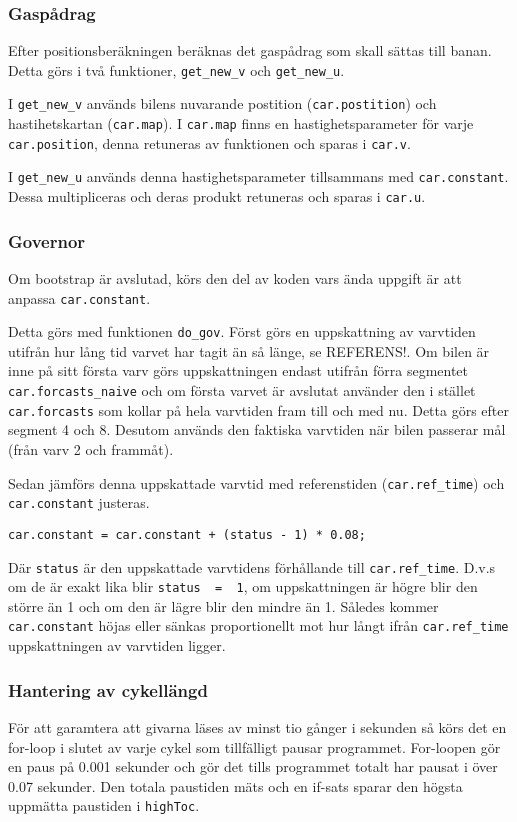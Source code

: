 \subsubsection{Gaspådrag}

Efter positionsberäkningen beräknas det gaspådrag som skall sättas till banan. Detta görs i två
funktioner, \texttt{get\_new\_v} och \texttt{get\_new\_u}.
 
I \texttt{get\_new\_v} används bilens nuvarande postition (\texttt{car.postition})
och hastihetskartan (\texttt{car.map}). I \texttt{car.map} finns en
hastighetsparameter för varje \texttt{car.position}, denna retuneras av funktionen
och sparas i \texttt{car.v}.
 
I \texttt{get\_new\_u} används denna hastighetsparameter tillsammans med
\texttt{car.constant}. Dessa multipliceras och deras produkt retuneras och sparas
i \texttt{car.u}.

\subsubsection{Governor}
\label{sec:systembeskrivning:governor}
Om bootstrap är avslutad, körs den del av koden vars ända uppgift är att 
anpassa \texttt{car.constant}. 

Detta görs med funktionen \texttt{do\_gov}.  Först görs en uppskattning av 
varvtiden utifrån hur lång tid varvet har tagit än
så länge, se REFERENS!. Om bilen är inne på sitt första varv görs uppskattningen endast
utifrån förra segmentet \texttt{car.forcasts\_naive} och om första varvet är
avslutat använder den i stället \texttt{car.forcasts} som kollar på hela varvtiden
fram till och med nu. Detta görs efter segment 4 och 8. Desutom används den
faktiska varvtiden när bilen passerar mål (från varv 2 och frammåt).
 
Sedan jämförs denna uppskattade varvtid med referenstiden (\texttt{car.ref\_time}) 
och \texttt{car.constant} justeras.
\begin{verbatim}
car.constant = car.constant + (status - 1) * 0.08;
\end{verbatim}
Där \texttt{status} är den uppskattade varvtidens förhållande till \texttt{car.ref\_time}.
D.v.s om de är exakt lika blir \texttt{status~ =~ 1}, om uppskattningen är högre blir
den större än 1 och om den är lägre blir den mindre än 1. Således kommer \texttt{car.constant}
höjas eller sänkas proportionellt mot hur långt ifrån \texttt{car.ref\_time} uppskattningen
av varvtiden ligger. 

\subsubsection{Hantering av cykellängd}
\label{sec:system:korning:cykel}
För att garamtera att givarna läses av minst tio gånger i sekunden så körs det
en for-loop i slutet av varje cykel som tillfälligt pausar programmet.
For-loopen gör en paus på 0.001 sekunder och gör det tills programmet totalt har
pausat i över 0.07 sekunder. Den totala paustiden mäts och en if-sats sparar den högsta
uppmätta paustiden i \texttt{highToc}.